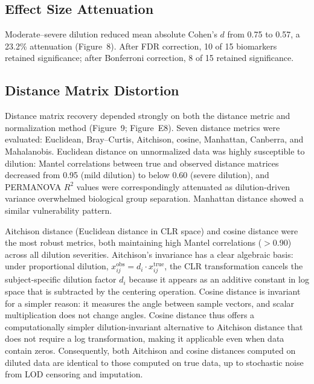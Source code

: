 \documentclass[12pt]{article}
\begin{document}
\subsection{Effect Size Attenuation}

Moderate--severe dilution reduced mean absolute Cohen's $d$ from 0.75 to 0.57, a 23.2\% attenuation (Figure~8). After FDR correction, 10 of 15 biomarkers retained significance; after Bonferroni correction, 8 of 15 retained significance.

\subsection{Distance Matrix Distortion}

Distance matrix recovery depended strongly on both the distance metric and normalization method (Figure~9; Figure~E8). Seven distance metrics were evaluated: Euclidean, Bray--Curtis, Aitchison, cosine, Manhattan, Canberra, and Mahalanobis. Euclidean distance on unnormalized data was highly susceptible to dilution: Mantel correlations between true and observed distance matrices decreased from 0.95 (mild dilution) to below 0.60 (severe dilution), and PERMANOVA $R^2$ values were correspondingly attenuated as dilution-driven variance overwhelmed biological group separation. Manhattan distance showed a similar vulnerability pattern.

Aitchison distance (Euclidean distance in CLR space) and cosine distance were the most robust metrics, both maintaining high Mantel correlations ($>$0.90) across all dilution severities. Aitchison's invariance has a clear algebraic basis: under proportional dilution, $x_{ij}^{\mathrm{obs}} = d_i \cdot x_{ij}^{\mathrm{true}}$, the CLR transformation cancels the subject-specific dilution factor $d_i$ because it appears as an additive constant in log space that is subtracted by the centering operation. Cosine distance is invariant for a simpler reason: it measures the angle between sample vectors, and scalar multiplication does not change angles. Cosine distance thus offers a computationally simpler dilution-invariant alternative to Aitchison distance that does not require a log transformation, making it applicable even when data contain zeros. Consequently, both Aitchison and cosine distances computed on diluted data are identical to those computed on true data, up to stochastic noise from LOD censoring and imputation.
\end{document}
